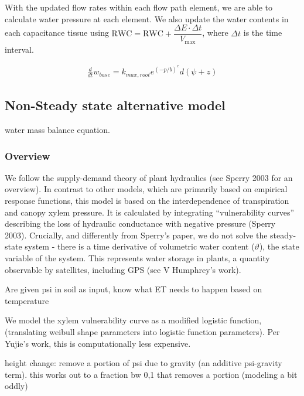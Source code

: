 \documentclass[twoside,10pt]{report}
\begin{document}
\par With the updated flow rates within each flow path element, we are able to calculate water pressure at each element. We also update the water contents in each capacitance tissue using $\text{RWC} = \text{RWC} + \dfrac{\Delta E \cdot \Delta t}{V_\text{max}}$, where $\Delta t$ is the time interval.


\begin{equation}
\begin{aligned}
    \frac{d}{dt}w_{base} = k_{max,root}e^{(-p/b)^e}d(\psi + z)
\end{aligned}
\end{equation}


%
\subsection{Non-Steady state alternative model}

water mass balance equation. 

\subsubsection{Overview}

We follow the supply-demand theory of plant hydraulics (see Sperry 2003 for an overview). In contrast to other models, which are primarily based on empirical response functions, this model is based on the interdependence of transpiration and canopy xylem pressure. It is calculated by integrating “vulnerability curves” describing the loss of hydraulic conductance with negative pressure (Sperry 2003). Crucially, and differently from Sperry’s paper, we do not solve the steady-state system - there is a time derivative of volumetric water content ($\vartheta$), the state variable of the system. This represents water storage in plants, a quantity observable by satellites, including GPS (see V Humphrey's work). 

Are given psi in soil as input, know what ET needs to happen based on temperature 

We model the xylem vulnerability curve as a modified logistic function, (translating weibull shape parameters into logistic function parameters). Per Yujie's work, this is computationally less expensive.

height change: remove a portion of psi due to gravity (an additive psi-gravity term). this works out to a fraction bw 0,1 that removes a portion (modeling a bit oddly)
\end{document}
